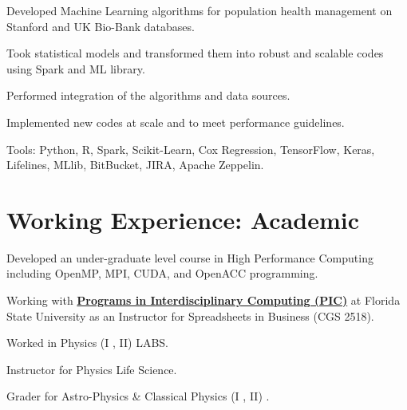 \documentclass[]{template}
\begin{document}

\vspace{\topsep} %
\begin{tightemize}
\item Developed Machine Learning algorithms for population health management on Stanford and UK Bio-Bank databases.
\item Took statistical models and transformed them into robust and scalable codes using Spark and ML library.
\item Performed integration of the algorithms and data sources.
\item Implemented new codes at scale and to meet performance guidelines.
\item Tools: Python, R, Spark, Scikit-Learn, Cox Regression, TensorFlow, Keras, Lifelines, MLlib, BitBucket, JIRA, Apache Zeppelin.

\end{tightemize}

\sectionsep
\sectionsep
\sectionsep
\sectionsep

\section{Working Experience: Academic}
\sectionsep


\vspace{\topsep}
\begin{tightemize}
\item Developed an under-graduate level course in High Performance Computing including OpenMP, MPI, CUDA, and OpenACC programming.
\item Working with \textbf{\href{https://pic.fsu.edu/}{Programs in Interdisciplinary Computing (PIC)}} at Florida State University as an Instructor for Spreadsheets in Business (CGS 2518). 
\end{tightemize}

\sectionsep


\begin{tightemize}
\item Worked in Physics (I , II) LABS.
\item Instructor for Physics Life Science.
\item Grader for Astro-Physics \& Classical Physics (I , II) .
\end{tightemize}
\end{document}
